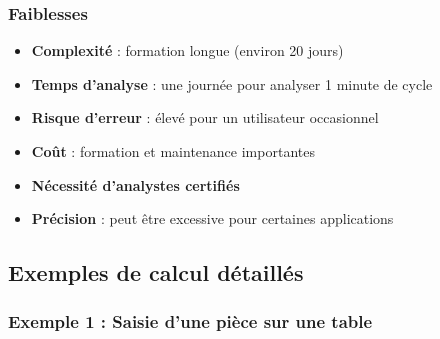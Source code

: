 \documentclass[a4paper,12pt]{article}
\begin{document}
\subsubsection{Faiblesses}

\begin{itemize}
    \item \textbf{Complexité} : formation longue (environ 20 jours)
    \item \textbf{Temps d'analyse} : une journée pour analyser 1 minute de cycle
    \item \textbf{Risque d'erreur} : élevé pour un utilisateur occasionnel
    \item \textbf{Coût} : formation et maintenance importantes
    \item \textbf{Nécessité d'analystes certifiés}
    \item \textbf{Précision} : peut être excessive pour certaines applications
\end{itemize}

\begin{center}
\end{center}

\subsection{Exemples de calcul détaillés}

\subsubsection{Exemple 1 : Saisie d'une pièce sur une table}
\end{document}
